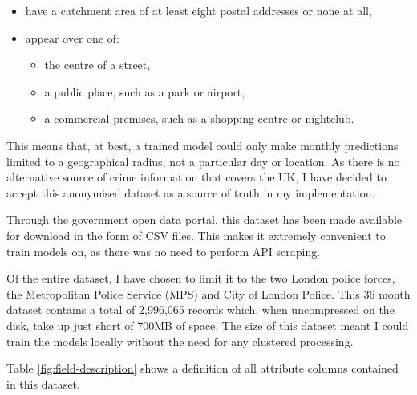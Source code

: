 \documentclass{article}
\begin{document}
	\begin{itemize}
		\item have a catchment area of at least eight postal addresses or none at all,
		\item appear over one of:
		\begin{itemize}
			\item the centre of a street,
			\item a public place, such as a park or airport,
			\item a commercial premises, such as a shopping centre or nightclub.
		\end{itemize}
	\end{itemize}

	This means that, at best, a trained model could only make monthly predictions limited to a geographical radius, not a particular day or location. As there is no alternative source of crime information that covers the UK, I have decided to accept this anonymised dataset as a source of truth in my implementation.

	Through the government open data portal, this dataset has been made available for download in the form of CSV files. This makes it extremely convenient to train models on, as there was no need to perform API scraping.

	Of the entire dataset, I have chosen to limit it to the two London police forces, the Metropolitan Police Service (MPS) and City of London Police. This 36 month dataset contains a total of 2,996,065 records which, when uncompressed on the disk, take up just short of 700MB of space. The size of this dataset meant I could train the models locally without the need for any clustered processing.

	Table \ref{fig:field-description} shows a definition of all attribute columns contained in this dataset.
\end{document}
